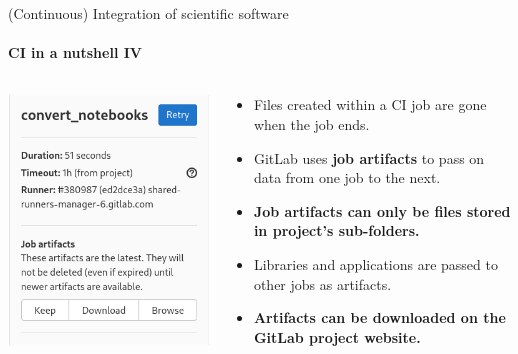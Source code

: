 \begin{frame}{(Continuous) Integration of scientific software} 
\framesubtitle{CI in a nutshell IV}
    \vfill
    
    \begin{columns}
        \begin{column}[c]{0.3\textwidth}
            \includegraphics[width=\textwidth]{figures/artifacts.png}
        \end{column}
        \begin{column}[c]{0.7\textwidth}
            \begin{itemize}
                \item Files created within a CI job are gone when the job ends. 
                \item GitLab uses \textbf{job artifacts} to pass on data from one job to the next. 
                \item \textbf{Job artifacts can only be files stored in project's sub-folders.} 
                \item Libraries and applications are passed to other jobs as artifacts. 
                \item \textbf{Artifacts can be downloaded on the GitLab project website.}
            \end{itemize}
        \end{column}
    \end{columns}


\end{frame}

